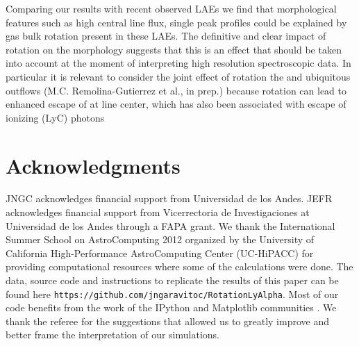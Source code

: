 Comparing our results with recent observed LAEs we find that
morphological features such as high central line flux, single peak
profiles could be explained by gas bulk rotation present in these
LAEs.
The definitive and clear impact of rotation on the \ly morphology
suggests that this is an effect that should be taken into account at
the moment of interpreting high resolution spectroscopic data. In
particular it is relevant to consider the joint effect of rotation the
and ubiquitous outflows (M.C. Remolina-Gutierrez et al., in prep.)
because rotation can lead to enhanced escape of \ly at line center, which
has also been associated with escape of ionizing (LyC) photons
\citep{Behrens2014,2014arXiv1404.2958V}
\section*{Acknowledgments}
JNGC acknowledges financial support from Universidad de los
Andes.
JEFR acknowledges financial support from Vicerrectoria de
Investigaciones at Universidad de los Andes through a FAPA grant.
We thank the International Summer School on AstroComputing
2012 organized by the University of California High-Performance
AstroComputing Center (UC-HiPACC) for providing computational
resources where some of the calculations were done.
The data, source code and instructions to
replicate the results of this paper can be found
here {\texttt{https://github.com/jngaravitoc/RotationLyAlpha}}.
Most of our code benefits from the work of the IPython and Matplotlib
communities \citep{IPython,matplotlib}.
We thank the referee for the suggestions that allowed us to greatly
improve and better frame the interpretation of our simulations.
\appendix
